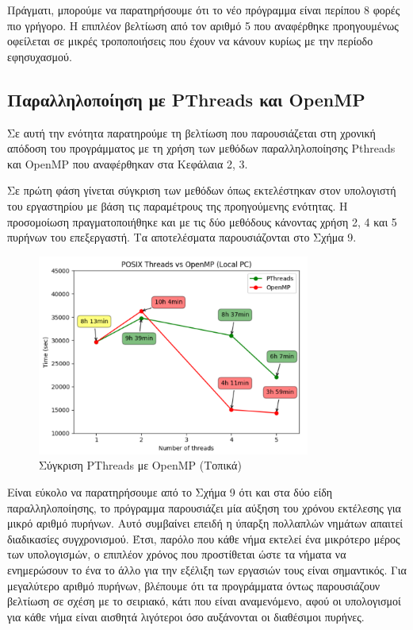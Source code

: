 \documentclass[12pt,a4paper]{article}
\begin{document}
Πράγματι, μπορούμε να παρατηρήσουμε ότι το νέο πρόγραμμα είναι περίπου 8 φορές πιο γρήγορο. Η επιπλέον βελτίωση από τον αριθμό 5 που αναφέρθηκε προηγουμένως οφείλεται σε μικρές τροποποιήσεις που έχουν να κάνουν κυρίως με την περίοδο εφησυχασμού.

\subsection{Παραλληλοποίηση με PThreads και OpenMP}

Σε αυτή την ενότητα παρατηρούμε τη βελτίωση που παρουσιάζεται στη χρονική απόδοση του προγράμματος με τη χρήση των μεθόδων παραλληλοποίησης Pthreads και OpenMP που αναφέρθηκαν στα Κεφάλαια 2, 3.

Σε πρώτη φάση γίνεται σύγκριση των μεθόδων όπως εκτελέστηκαν στον υπολογιστή του εργαστηρίου με βάση τις παραμέτρους της προηγούμενης ενότητας. Η προσομοίωση πραγματοποιήθηκε και με τις δύο μεθόδους κάνοντας χρήση 2, 4 και 5 πυρήνων του επεξεργαστή. Τα αποτελέσματα παρουσιάζονται στο Σχήμα 9.

\begin{figure}[h!]
\centering
\includegraphics[width=0.8\textwidth]{Figures/posvsomp.png}
\caption{Σύγκριση PThreads με OpenMP (Τοπικά)}
\end{figure}

Είναι εύκολο να παρατηρήσουμε από το Σχήμα 9 ότι και στα δύο είδη παραλληλοποίησης, το πρόγραμμα παρουσιάζει μία αύξηση του χρόνου εκτέλεσης για μικρό αριθμό πυρήνων. Αυτό συμβαίνει επειδή η ύπαρξη πολλαπλών νημάτων απαιτεί διαδικασίες συγχρονισμού. Έτσι, παρόλο που κάθε νήμα εκτελεί ένα μικρότερο μέρος των υπολογισμών, ο επιπλέον χρόνος που προστίθεται ώστε τα νήματα να ενημερώσουν το ένα το άλλο για την εξέλιξη των εργασιών τους είναι σημαντικός. Για μεγαλύτερο αριθμό πυρήνων, βλέπουμε ότι τα προγράμματα όντως παρουσιάζουν βελτίωση σε σχέση με το σειριακό, κάτι που είναι αναμενόμενο, αφού οι υπολογισμοί για κάθε νήμα είναι αισθητά λιγότεροι όσο αυξάνονται οι διαθέσιμοι πυρήνες.
\end{document}
